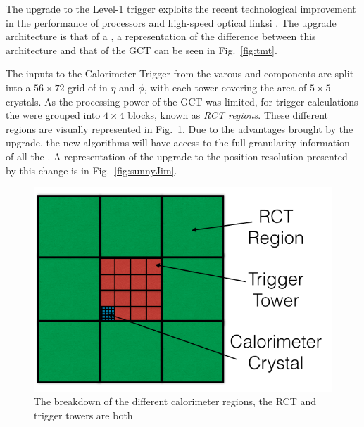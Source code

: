 The upgrade to the Level-1 trigger exploits the recent technological
improvement in the performance of \FPGA processors and high-speed
optical linksi \cite{tp}. The upgrade architecture is that of a \TMT, a 
representation of the difference between this architecture and that of
the \ac{GCT} can be seen in Fig.~\ref{fig:tmt}.

The inputs to the Calorimeter Trigger from the varous \ECAL and \HCAL
components are split into a $56\times 72$ grid of \TT in $\eta$ and
$\phi$, with each tower covering the area of $5\times5$ \ECAL crystals.
As the processing power of the \ac{GCT} was limited, for trigger
calculations the \TT were grouped into $4\times4$ blocks, known as
\emph{RCT regions}. These different regions are visually represented
in Fig.~\ref{fig:trigger_calorimeter}. Due to the advantages brought
by the upgrade, the new algorithms will have access to the full
granularity information of all the \TT. A representation of the
upgrade to the position resolution presented by this change is in
Fig.~\ref{fig:sunnyJim}.

\begin{figure}
	\begin{center}
		\includegraphics[width=0.7\linewidth]{figs/trigger/trigger_calorimeter}
	\end{center}
	\caption{The breakdown of the different calorimeter regions, the RCT
  and trigger towers are both }
	\label{fig:trigger_calorimeter}
\end{figure}

